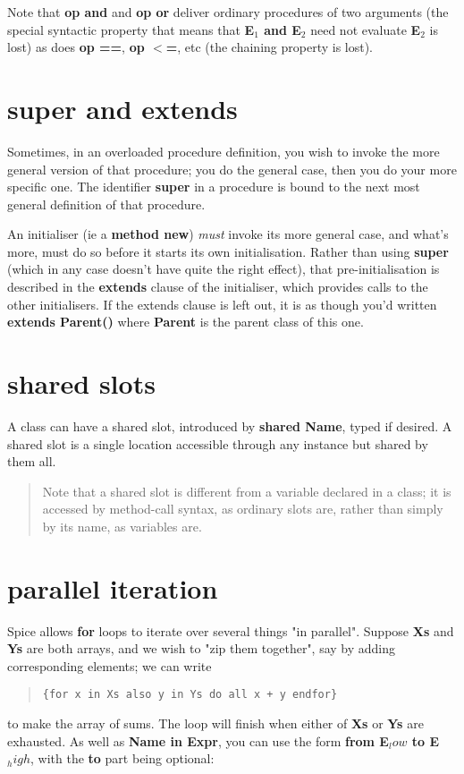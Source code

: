 \documentclass{report}
\begin{document}
Note that {\bf op and} and {\bf op or} deliver ordinary procedures of two arguments
(the special syntactic property that means that {\bf E$_ 1$ and E$_ 2$} need not
evaluate {\bf E$_ 2$} is lost) as does {\bf op ==}, {\bf op $<$=}, etc (the chaining property
is lost).\section{super and extends}


Sometimes, in an overloaded procedure definition, you wish to invoke
the more general version of that procedure; you do the general case, then you
do your more specific one. The identifier {\bf super} in a procedure is bound to
the next most general definition of that procedure.

An initialiser (ie a {\bf method new}) {\em must} invoke its more general case,
and what's more, must do so before it starts its own initialisation. Rather
than using {\bf super} (which in any case doesn't have quite the right effect),
that pre-initialisation is described in the {\bf extends} clause of the
initialiser, which provides calls to the other initialisers. If the extends
clause is left out, it is as though you'd written {\bf extends Parent()} where
{\bf Parent} is the parent class of this one.\section{shared slots}


A class can have a shared slot, introduced by {\bf shared Name}, typed if desired.
A shared slot is a single location accessible through any instance but shared
by them all.

\begin{quote}Note that a shared slot is different from a variable declared in a class;
it is accessed by method-call syntax, as ordinary slots are, rather than
simply by its name, as variables are.\end{quote}\section{parallel iteration}


Spice allows {\bf for} loops to iterate over several things "in parallel".
Suppose {\bf Xs} and {\bf Ys} are both arrays, and we wish to "zip them together",
say by adding corresponding elements; we can write

\begin{quote}
\begin{verbatim}
{for x in Xs also y in Ys do all x + y endfor}
\end{verbatim}
\end{quote}
to make the array of sums. The loop will finish when either of {\bf Xs} or {\bf Ys}
are exhausted. As well as {\bf Name in Expr}, you can use the form {\bf from E$_ low$ to
E$_ high$}, with the {\bf to} part being optional:
\end{document}
